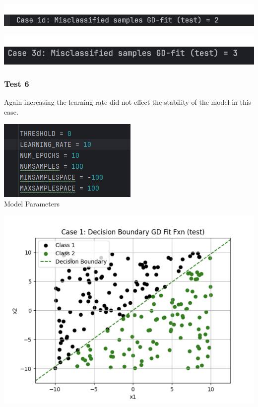 \documentclass{article}
\begin{document}
\begin{center}
\includegraphics[scale=0.75]{../figs/T5.4.png} \\
\end{center}

\begin{center}
\includegraphics[scale=0.75]{../figs/T5.3.png} \\
\end{center}

\subsubsection{Test 6}

Again increasing the learning rate did not effect the stability of the model in this case.

\begin{center}
\includegraphics[scale=0.75]{../figs/T2.1.png} \\
\caption{Model Parameters}
\end{center}

\begin{center}
\includegraphics[scale=0.75]{../figs/T6.1.png} \\
\end{center}
\end{document}
